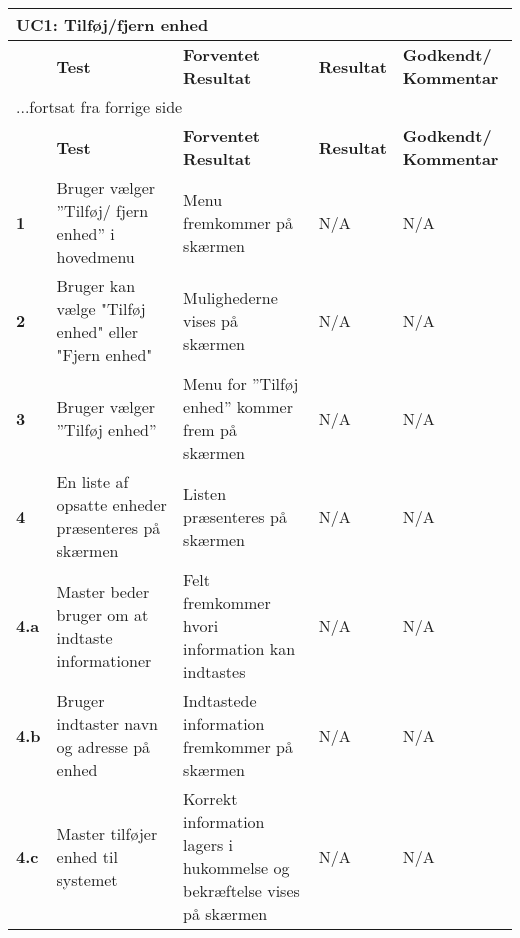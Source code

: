 \begin{center}
\begin{longtable}{|p{}|p{}|p{}|p{}|p{}|} %
\hline
\multicolumn{5}{|l|}{\textbf{UC1: Tilføj/fjern enhed}} \\ \hline
\multicolumn{1}{|c|}{} &
\textbf{Test} &
\textbf{Forventet \newline Resultat} &
\textbf{Resultat} &
\textbf{Godkendt/ \newline Kommentar} \\ \hline 
\endfirsthead

\multicolumn{5}{l}{...fortsat fra forrige side} \\ \hline 
\multicolumn{1}{|c|}{} &
\textbf{Test} &
\textbf{Forventet \newline Resultat} &
\textbf{Resultat} &
\textbf{Godkendt/ \newline Kommentar} \\ \hline 
\endhead


\textbf{1}	&Bruger vælger ''Tilføj/ fjern enhed'' i hovedmenu 
			&Menu fremkommer på skærmen 
			&N/A 
			&N/A \\\hline
			 
\textbf{2}	&Bruger kan vælge "Tilføj enhed" eller "Fjern enhed" 
			&Mulighederne vises på skærmen 
			&N/A 
			&N/A \\\hline
			 
\textbf{3}	&Bruger vælger ''Tilføj enhed'' 
			&Menu for ''Tilføj enhed'' kommer frem på skærmen 
			&N/A 
			&N/A \\\hline
			 
\textbf{4}	&En liste af opsatte enheder præsenteres på skærmen 
			&Listen præsenteres på skærmen 
			&N/A
			&N/A \\\hline 
			
\textbf{4.a}&Master beder bruger om at indtaste informationer 
			&Felt fremkommer hvori information kan indtastes 
			&N/A 
			&N/A \\\hline
			
\textbf{4.b}&Bruger indtaster navn og adresse på enhed 
			&Indtastede information fremkommer på skærmen 
			&N/A 
			&N/A \\\hline
			 
\textbf{4.c}&Master tilføjer enhed til systemet 
			&Korrekt information lagers i hukommelse og bekræftelse vises på skærmen 
			&N/A 
			&N/A \\\hline
			 

\end{longtable}
\end{center}

